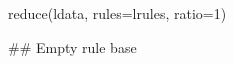 \begin{Schunk}
% --begin: "casestudy-assoc-reduce"
\begin{Sinput}
reduce(ldata, rules=lrules, ratio=1)
\end{Sinput}
\begin{Soutput}
## Empty rule base
\end{Soutput}
%
% --end: "casestudy-assoc-reduce"
\end{Schunk}
